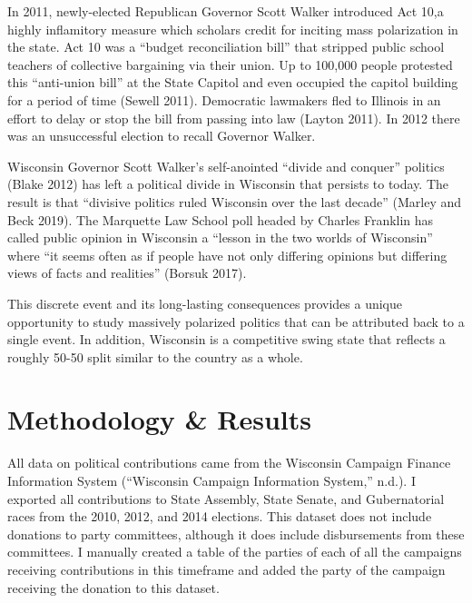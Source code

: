 \documentclass[12pt,]{article}
\begin{document}
In 2011, newly-elected Republican Governor Scott Walker introduced Act
10,a highly inflamitory measure which scholars credit for inciting mass
polarization in the state. Act 10 was a ``budget reconciliation bill''
that stripped public school teachers of collective bargaining via their
union. Up to 100,000 people protested this ``anti-union bill'' at the
State Capitol and even occupied the capitol building for a period of
time (Sewell 2011). Democratic lawmakers fled to Illinois in an effort
to delay or stop the bill from passing into law (Layton 2011). In 2012
there was an unsuccessful election to recall Governor Walker.

Wisconsin Governor Scott Walker's self-anointed ``divide and conquer''
politics (Blake 2012) has left a political divide in Wisconsin that
persists to today. The result is that ``divisive politics ruled
Wisconsin over the last decade'' (Marley and Beck 2019). The Marquette
Law School poll headed by Charles Franklin has called public opinion in
Wisconsin a ``lesson in the two worlds of Wisconsin'' where ``it seems
often as if people have not only differing opinions but differing views
of facts and realities'' (Borsuk 2017).

This discrete event and its long-lasting consequences provides a unique
opportunity to study massively polarized politics that can be attributed
back to a single event. In addition, Wisconsin is a competitive swing
state that reflects a roughly 50-50 split similar to the country as a
whole.

\hypertarget{methodology-results}{%
\section{Methodology \& Results}\label{methodology-results}}

All data on political contributions came from the Wisconsin Campaign
Finance Information System (``Wisconsin Campaign Information System,''
n.d.). I exported all contributions to State Assembly, State Senate, and
Gubernatorial races from the 2010, 2012, and 2014 elections. This
dataset does not include donations to party committees, although it does
include disbursements from these committees. I manually created a table
of the parties of each of all the campaigns receiving contributions in
this timeframe and added the party of the campaign receiving the
donation to this dataset.
\end{document}
